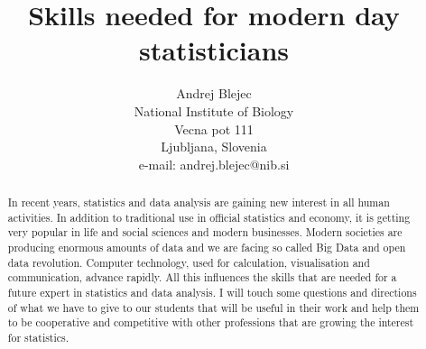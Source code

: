 \documentclass[12pt]{article}
\begin{document}
\title{Skills needed for modern day statisticians}%
\author{Andrej Blejec\\[12pt]
National Institute of Biology\\
Vecna pot 111\\Ljubljana, Slovenia\\e-mail: andrej.blejec@nib.si}%
\date{}
\maketitle
\begin{abstract}
  In recent years, statistics and data analysis are gaining new interest in all human activities. In addition to traditional use in official statistics and economy, it is getting very popular in life and social sciences and modern businesses. Modern societies are producing enormous amounts of data and we are facing so called Big Data and open data revolution. Computer technology, used for calculation, visualisation and communication, advance rapidly. All this influences the skills that are needed for a future expert in statistics and data analysis. I will touch some questions and directions of what we have to give to our students that will be useful in their work and help them to be cooperative and competitive with other professions that are growing the interest for statistics.
\end{abstract}
\end{document}
